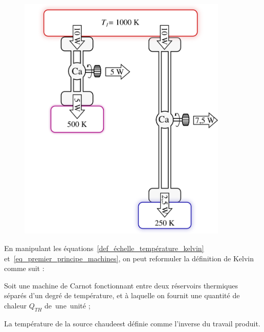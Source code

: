 		\begin{figure}
			\begin{center}
				\includegraphics[width=10cm]{images/echelle_temperature_kelvin.png}
			\end{center}
			\label{fig_échelle_température_kelvin}
		\end{figure}

		En manipulant les équations~\ref{def_échelle_température_kelvin} et~\ref{eq_premier_principe_machines}, on peut reformuler la définition de Kelvin comme suit :

		\begin{trucimportant}
			Soit une machine de Carnot fonctionnant
			entre deux réservoirs thermiques séparés d’un degré de température,\linebreak
			et à laquelle on fournit une quantité de chaleur $Q_{TH}$ de~une~unité ;

			La température de la source chaude\linebreak est définie comme l’inverse du travail produit.
		\end{trucimportant}

